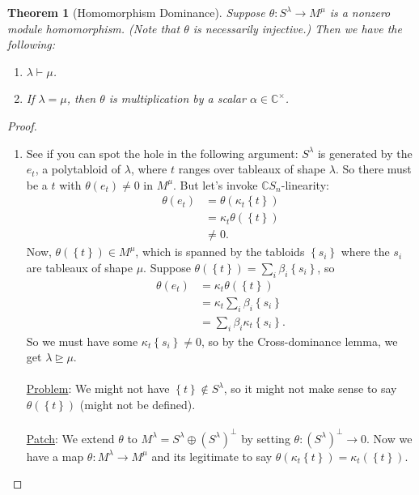 \documentclass[12pt]{article}
\newcommand{\cx}{\mathbb{C}}
\newcommand\paren[1]{\left( #1 \right)}
\newcommand\setb[1]{\left \{ #1 \right \}}
\newtheorem{theorem}{Theorem}[section]
\theoremstyle{definition}
\begin{document}
\begin{theorem}[Homomorphism Dominance]
    Suppose $\theta : S^{\lambda} \to M^{\mu}$ is a nonzero module homomorphism. (Note that $\theta$ is necessarily injective.) Then we have the following:
    \begin{enumerate}
        \item $\lambda \vdash \mu$.
        \item If $\lambda = \mu$, then $\theta$ is multiplication by a scalar $\alpha \in \cx^{\times}$.
    \end{enumerate}
\end{theorem}
\begin{proof}
    \noindent
    \begin{enumerate}
        \item See if you can spot the hole in the following argument:
        $S^{\lambda}$ is generated by the $e_t$, a polytabloid of $\lambda$, where $t$ ranges over tableaux of shape $\lambda$. So there must be a $t$ with $\theta(e_t) \neq 0$ in $M^{\mu}$. But let's invoke $\cx S_n$-linearity:
        \begin{align*}
            \theta(e_t) & = \theta \paren{ \kappa_t \setb{ t } } \\
            & = \kappa_t \theta \paren{ \setb{t} } \\
            & \neq 0.
        \end{align*}
        Now, $\theta \paren{ \setb{ t } } \in M^{\mu}$, which is spanned by the tabloids $\setb{ s_i }$ where the $s_i$ are tableaux of shape $\mu$. Suppose $\theta \paren{ \setb{ t } } = \sum\limits_i \beta_i \setb{ s_i }$, so 
        \begin{align*}
            \theta(e_t) & = \kappa_t \theta \paren{ \setb{ t } } \\
            & = \kappa_t \sum\limits_i \beta_i \setb{ s_i } \\
            & = \sum\limits_i \beta_i \kappa_t \setb{ s_i }.
        \end{align*}
        So we must have some $\kappa_t \setb{ s_i } \neq 0$, so by the Cross-dominance lemma, we get $\lambda \trianglerighteq \mu$. \\\\
        \underline{Problem}: We might not have $\setb{ t } \notin S^{\lambda}$, so it might not make sense to say $\theta \paren{ \setb{ t } }$ (might not be defined). \\\\
        \underline{Patch}: We extend $\theta$ to $M^{\lambda} = S^{\lambda} \oplus \paren{ S^{\lambda} }^{\perp}$ by setting $\theta : \paren{ S^{\lambda} }^{\perp} \to 0$. Now we have a map $\theta : M^{\lambda} \to M^{\mu}$ and its legitimate to say $\theta \paren{ \kappa_t \setb{ t } } = \kappa_t \paren{ \setb{ t } }$.

\end{enumerate}
\end{proof}
\end{document}
